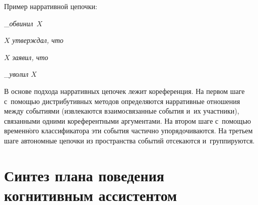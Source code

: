 \begin{multicols}{2}
Пример нарративной цепочки:

\_\textit{обвинил}~$X$

$X$ \textit{утверждал, что}

$X$ \textit{заявил, что}

\_\textit{уволил} $X$
    
    В основе подхода нарративных цепочек лежит кореференция. На первом 
шаге с~помощью дистрибутивных методов определяются нарративные 
отношения между событиями (извлекаются взаимосвязанные события и~их 
участники), связанными одними кореферентными аргументами. На втором 
шаге с~по\-мощью временн$\acute{\mbox{о}}$го классификатора эти события 
час\-тич\-но упорядочиваются. На третьем шаге автономные цепочки из 
про\-стран\-ст\-ва событий отсекаются и~группируются.

\section{Синтез плана поведения когнитивным ассистентом}


\end{multicols}
